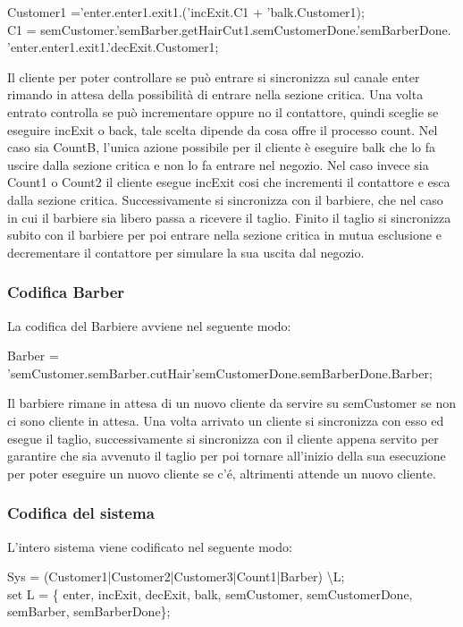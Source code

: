 \textsf{Customer1 ='enter.enter1.exit1.('incExit.C1 + 'balk.Customer1);}\\
\textsf{C1 = semCustomer.'semBarber.getHairCut1.semCustomerDone.'semBarberDone.}\\
\textsf{'enter.enter1.exit1.'decExit.Customer1;}

Il cliente per poter controllare se può entrare si sincronizza sul canale enter rimando in attesa della possibilità di entrare nella sezione critica. Una volta entrato controlla se può incrementare oppure no il contattore, quindi sceglie se eseguire \textsf{incExit} o \textsf{back}, tale scelta dipende da cosa offre il processo \textsf{count}. Nel caso sia \textsf{CountB}, l'unica azione possibile per il cliente è eseguire \textsf{balk} che lo fa uscire dalla sezione critica e non lo fa entrare nel negozio. Nel caso invece sia \textsf{Count1} o \textsf{Count2} il cliente esegue \textsf{incExit} cosi che incrementi il contattore e esca dalla sezione critica. Successivamente si sincronizza con il barbiere, che nel caso in cui il barbiere sia libero passa a ricevere il taglio. Finito il taglio si sincronizza subito con il barbiere per poi entrare nella sezione critica in mutua esclusione e decrementare il contattore per simulare la sua uscita dal negozio.

\subsubsection{Codifica Barber}

La codifica del Barbiere avviene nel seguente modo:

\textsf{Barber = 'semCustomer.semBarber.cutHair'semCustomerDone.semBarberDone.Barber;}

Il barbiere rimane in attesa di un nuovo cliente da servire su \textsf{semCustomer} se non ci sono cliente in attesa. Una volta arrivato un cliente si sincronizza con esso ed esegue il taglio, successivamente si sincronizza con il cliente appena servito per garantire che sia avvenuto il taglio per poi tornare all'inizio della sua esecuzione per poter eseguire un nuovo cliente se c'é, altrimenti attende un nuovo cliente.

\subsubsection{Codifica del sistema}

L'intero sistema viene codificato nel seguente modo:

\textsf{Sys = (Customer1|Customer2|Customer3|Count1|Barber) \textbackslash L;}\\
\textsf{set L = \{ enter, incExit, decExit, balk, semCustomer, semCustomerDone, semBarber, semBarberDone\};}

